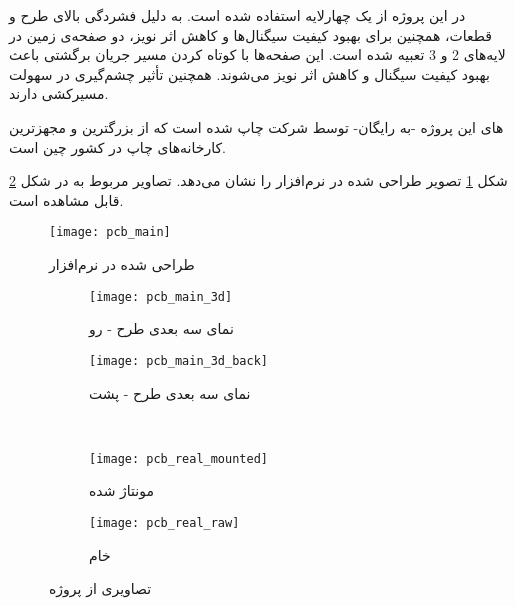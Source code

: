 	در این پروژه از یک \pcbf چهارلایه استفاده شده است. به دلیل فشردگی بالای طرح و قطعات، همچنین برای بهبود کیفیت سیگنال‌ها و کاهش اثر نویز، دو صفحه‌ی زمین در لایه‌های 2 و 3 تعبیه شده است. این صفحه‌ها با کوتاه کردن مسیر جریان برگشتی باعث بهبود کیفیت سیگنال و کاهش اثر نویز می‌شوند. همچنین تأثیر چشم‌گیری در سهولت مسیرکشی \pcbf دارند.

 \pcbf 
 های این پروژه -به رایگان- توسط شرکت \cite{PCBWay} چاپ شده است که از بزرگترین و مجهزترین کارخانه‌های چاپ \pcbf در کشور چین است.
 
 شکل \ref{fig:pcb_design}  تصویر \pcbf طراحی شده در نرم‌افزار  را نشان می‌دهد. تصاویر مربوط به \pcbf در شکل \ref{fig:pcb-images} قابل مشاهده است.
 
 \begin{figure}[h]
 	\centering
 	\texttt{[image: pcb\_main]}
 	\caption{\pcbf طراحی شده در نرم‌افزار }
 	\label{fig:pcb_design}
 \end{figure}
 
 \begin{figure}[h]
 	\centering
 	\begin{subfigure}{0.45\textwidth}
 		\centering
 		\texttt{[image: pcb\_main\_3d]}
 		\caption{نمای سه بعدی طرح - رو}
 	\end{subfigure}
 	\begin{subfigure}{0.45\textwidth}
 		\centering
 		\texttt{[image: pcb\_main\_3d\_back]}
 		\caption{نمای سه بعدی طرح - پشت}
 	\end{subfigure}\\
	\begin{subfigure}{0.4\textwidth}
		\centering
		\texttt{[image: pcb\_real\_mounted]}
		\caption{\pcbf مونتاژ شده}
	\end{subfigure}
	\begin{subfigure}{0.4\textwidth}
		\centering
		\texttt{[image: pcb\_real\_raw]}
		\caption{\pcbf خام}
	\end{subfigure}
 	\caption{تصاویری از \pcbf پروژه}
 	\label{fig:pcb-images}
 \end{figure}
 
